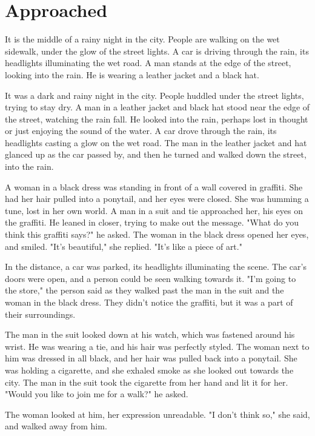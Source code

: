 \documentclass[smalldemyvopaper,11pt,twoside,onecolumn,openright,extrafontsizes]{memoir}
\begin{document}
\chapter{Approached}
It is the middle of a rainy night in the city. People are walking on the wet sidewalk, under the glow of the street lights. A car is driving through the rain, its headlights illuminating the wet road. A man stands at the edge of the street, looking into the rain. He is wearing a leather jacket and a black hat.\par
It was a dark and rainy night in the city. People huddled under the street lights, trying to stay dry. A man in a leather jacket and black hat stood near the edge of the street, watching the rain fall. He looked into the rain, perhaps lost in thought or just enjoying the sound of the water. A car drove through the rain, its headlights casting a glow on the wet road. The man in the leather jacket and hat glanced up as the car passed by, and then he turned and walked down the street, into the rain.\par
A woman in a black dress was standing in front of a wall covered in graffiti. She had her hair pulled into a ponytail, and her eyes were closed. She was humming a tune, lost in her own world. A man in a suit and tie approached her, his eyes on the graffiti. He leaned in closer, trying to make out the message. "What do you think this graffiti says?" he asked. The woman in the black dress opened her eyes, and smiled. "It's beautiful," she replied. "It's like a piece of art."\par
In the distance, a car was parked, its headlights illuminating the scene. The car's doors were open, and a person could be seen walking towards it. "I'm going to the store," the person said as they walked past the man in the suit and the woman in the black dress. They didn't notice the graffiti, but it was a part of their surroundings.\par
The man in the suit looked down at his watch, which was fastened around his wrist. He was wearing a tie, and his hair was perfectly styled. The woman next to him was dressed in all black, and her hair was pulled back into a ponytail. She was holding a cigarette, and she exhaled smoke as she looked out towards the city. The man in the suit took the cigarette from her hand and lit it for her. "Would you like to join me for a walk?" he asked.\par
The woman looked at him, her expression unreadable. "I don't think so," she said, and walked away from him.\par
\end{document}
